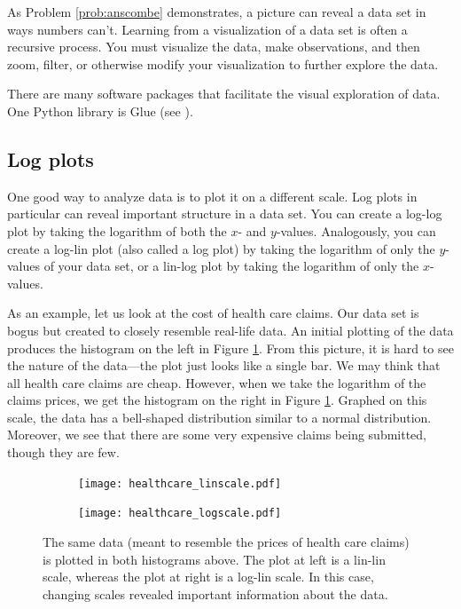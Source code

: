 As Problem \ref{prob:anscombe} demonstrates, a picture can reveal a data set in ways numbers can't. 
Learning from a visualization of a data set is often a recursive process. 
You must visualize the data, make observations, and then zoom, filter, or otherwise modify your visualization to further explore the data.



There are many software packages that facilitate the visual exploration of data. 
One Python library is Glue (see \cite{glue}).


\subsection*{Log plots}

One good way to analyze data is to plot it on a different scale. 
Log plots in particular can reveal important structure in a data set. 
You can create a log-log plot by taking the logarithm of both the $x$- and $y$-values. 
Analogously, you can create a log-lin plot (also called a log plot) by taking the logarithm of only the $y$-values of your data set, or a lin-log plot by taking the logarithm of only the $x$-values.

As an example, let us look at the cost of health care claims. 
Our data set is bogus but created to closely resemble real-life data. 
An initial plotting of the data produces the histogram on the left in Figure \ref{fig:healthcare}. 
From this picture, it is hard to see the nature of the data---the plot just looks like a single bar. 
We may think that all health care claims are cheap. 
However, when we take the logarithm of the claims prices, we get the histogram on the right in Figure \ref{fig:healthcare}. 
Graphed on this scale, the data has a bell-shaped distribution similar to a normal distribution. 
Moreover, we see that there are some very expensive claims being submitted, though they are few. 
\begin{figure}
\centering
\begin{subfigure}{.5\textwidth}
  \centering
  \texttt{[image: healthcare\_linscale.pdf]}
\end{subfigure}%
\begin{subfigure}{.5\textwidth}
  \centering
  \texttt{[image: healthcare\_logscale.pdf]}
\end{subfigure}
\caption{The same data (meant to resemble the prices of health care claims) is plotted in both histograms above. 
The plot at left is a lin-lin scale, whereas the plot at right is a log-lin scale. 
In this case, changing scales revealed important information about the data.}
\label{fig:healthcare}
\end{figure}

